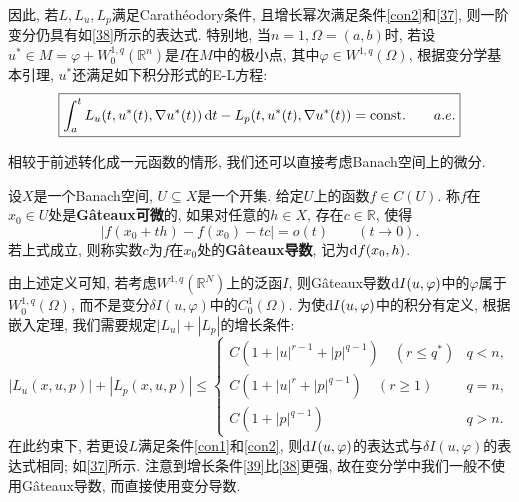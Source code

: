 因此, 若$L, L_u, L_p$满足Carathéodory条件, 且增长幂次满足条件\ref{con2}和\eqref{37}, 则一阶变分仍具有如\eqref{38}所示的表达式.
特别地, 当$n = 1, \Omega = (a, b)$时, 若设$u^* \in M = \varphi + W_0^{1, q}(\mathbb{R}^n)$是$I$在$M$中的极小点, 其中$\varphi \in W^{1, q}(\Omega)$, 根据变分学基本引理, $u^*$还满足如下积分形式的E-L方程:
\begin{equation*}
    \boxed{\int_a^tL_u(t, u^*(t), \nabla u^*(t)) \,{\rm d}t - L_p(t, u^*(t), \nabla u^*(t)) = {\rm const.} \qquad a.e.}
\end{equation*}

\begin{remark}
    相较于前述转化成一元函数的情形, 我们还可以直接考虑Banach空间上的微分.
    \begin{definition}
        设$X$是一个Banach空间, $U \subseteq X$是一个开集. 给定$U$上的函数$f \in C(U)$.
        称$f$在$x_0 \in U$处是\textbf{G\^ateaux可微}的, 如果对任意的$h \in X$, 存在$c \in \mathbb{R}$, 使得 
        \begin{equation*}
            |f(x_0 + th) - f(x_0) - tc| = o(t) \qquad (t \rightarrow 0).
        \end{equation*}
        若上式成立, 则称实数$c$为$f$在$x_0$处的\textbf{G\^ateaux导数}, 记为${\rm d}f(x_0, h)$.
    \end{definition}
    由上述定义可知, 若考虑$W^{1, q}(\mathbb{R}^N)$上的泛函$I$, 则G\^ateaux导数${\rm d}I(u, \varphi)$中的$\varphi$属于$W_0^{1, q}(\Omega)$, 而不是变分$\delta I(u, \varphi)$中的$C_0^1(\Omega)$.
    为使${\rm d}I(u, \varphi)$中的积分有定义, 根据嵌入定理, 我们需要规定$|L_u| + |L_p|$的增长条件:
    \begin{equation}\label{39}
        |L_u(x, u, p)| + |L_p(x, u, p)| \leq 
        \begin{cases}
            C(1 + |u|^{r - 1} + |p|^{q - 1}) \quad (r \leq q^*) &q < n, \\ 
            C(1 + |u|^r + |p|^{q - 1}) \quad (r \geq 1) &q = n, \\ 
            C(1 + |p|^{q - 1}) \quad &q > n.
        \end{cases}
    \end{equation}
    在此约束下, 若更设$L$满足条件\ref{con1}和\ref{con2}, 则${\rm d}I(u, \varphi)$的表达式与$\delta I(u, \varphi)$的表达式相同; 如\eqref{37}所示.
    注意到增长条件\eqref{39}比\eqref{38}更强, 故在变分学中我们一般不使用G\^ateaux导数, 而直接使用变分导数.
\end{remark}
